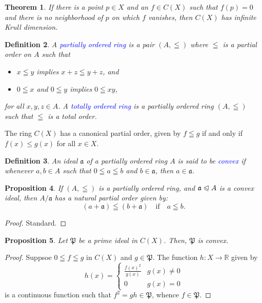 \documentclass[12pt]{article}
\theoremstyle{thmstyle}
\newtheorem{theorem}{Theorem}[section]
\newtheorem{proposition}[theorem]{Proposition}
\theoremstyle{defstyle}
\newtheorem{definition}[theorem]{Definition}
\newcommand{\R}{\mathbb{R}}
\newcommand{\fraka}{\mathfrak{a}} %
\newcommand{\frakP}{\mathfrak{P}} %
\newcommand{\define}[1]{\textcolor{blue}{\textit{#1}}}
\renewcommand{\le}{\leqslant}
\newcommand{\noreq}{\trianglelefteqslant}
\begin{document}
\begin{theorem}
    If there is a point $p\in X$ and an $f\in C(X)$ such that $f(p) = 0$ and there is no neighborhood of $p$ on which $f$ vanishes, then $C(X)$ has infinite Krull dimension.
\end{theorem}

\begin{definition}
    A \define{partially ordered ring} is a pair $(A,\leqq)$ where $\leqq$ is a partial order on $A$ such that
    \begin{itemize}
        \item $x\leqq y$ implies $x + z \leqq y + z$, and 
        \item $0\leqq x$ and $0\leqq y$ implies $0\leqq xy$,
    \end{itemize}
    for all $x,y,z\in A$.
    A \define{totally ordered ring} is a partially ordered ring $(A,\leqq)$ such that $\leqq$ is a total order.
\end{definition}

The ring $C(X)$ has a canonical partial order, given by $f\leqq g$ if and only if $f(x)\le g(x)$ for all $x\in X$.

\begin{definition}
    An ideal $\fraka$ of a partially ordered ring $A$ is said to be \define{convex} if whenever $a,b\in A$ such that $0\leqq a\leqq b$ and $b\in\fraka$, then $a\in\fraka$.
\end{definition}

\begin{proposition}
    If $(A,\leqq)$ is a partially ordered ring, and $\fraka\noreq A$ is a convex ideal, then $A/\fraka$ has a natural partial order given by: 
    \begin{equation*}
        (a + \fraka)\leqq(b + \fraka) \quad\text{if}\quad a\leqq b.
    \end{equation*}
\end{proposition}
\begin{proof}
    Standard.
\end{proof}

\begin{proposition}
    Let $\frakP$ be a prime ideal in $C(X)$. Then, $\frakP$ is convex.
\end{proposition}
\begin{proof}
    Suppsoe $0\leqq f\leqq g$ in $C(X)$ and $g\in\frakP$. The function $h: X\to\R$ given by 
    \begin{equation*}
        h(x) = 
        \begin{cases}
            \frac{f(x)^2}{g(x)} & g(x)\ne 0\\
            0 & g(x) = 0
        \end{cases}
    \end{equation*}
    is a continuous function such that $f^2 = gh\in\frakP$, whence $f\in\frakP$.
\end{proof}
\end{document}
